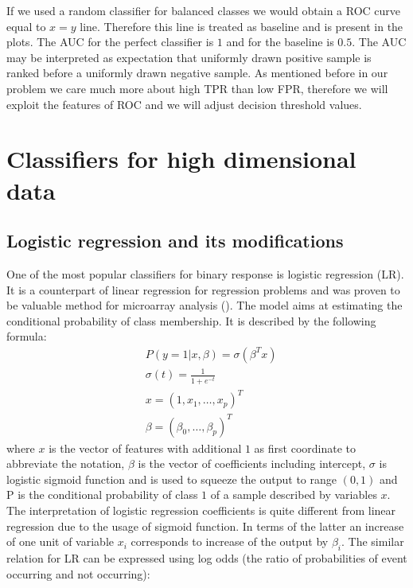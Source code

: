 \documentclass[shortabstract, english, mgr]{iithesis}
\begin{document}
If we used a random classifier for balanced classes we would obtain a ROC curve equal to $x=y$ line. Therefore this line is treated as baseline and is present in the plots. The AUC for the perfect classifier is $1$ and for the baseline is $0.5$. The AUC may be interpreted as expectation that uniformly drawn positive sample is ranked before a uniformly drawn negative sample. As mentioned before in our problem we care much more about high TPR than low FPR, therefore we will exploit the features of ROC and we will adjust decision threshold values.

\section{Classifiers for high dimensional data}

\subsection{Logistic regression and its modifications} \label{section:logit}

One of the most popular classifiers for binary response is logistic regression (LR). It is a counterpart of linear regression for regression problems and was proven to be valuable method for microarray analysis (\cite{LRgene}). The model aims at estimating the conditional probability of class membership. It is described by the following formula:
\begin{align*}
    &P(y=1 | x, \beta)=\sigma\left(\beta^{T} x\right) \\
    &\sigma(t) = \frac{1}{1+e^{-t}} \\
    &x=(1, x_1, \ldots, x_p)^T \\
    &\beta = (\beta_0, \ldots, \beta_p)^T
\end{align*}
where $x$ is the vector of features with additional $1$ as first coordinate to abbreviate the notation, $\beta$ is the vector of coefficients including intercept, $\sigma$ is logistic sigmoid function and is used to squeeze the output to range $(0,1)$ and P is the conditional probability of class $1$ of a sample described by variables $x$. The interpretation of logistic regression coefficients is quite different from linear regression due to the usage of sigmoid function. In terms of the latter an increase of one unit of variable $x_i$ corresponds to increase of the output by $\beta_i$. The similar relation for LR can be expressed using log odds (the ratio of probabilities of event occurring and not occurring):
\end{document}
